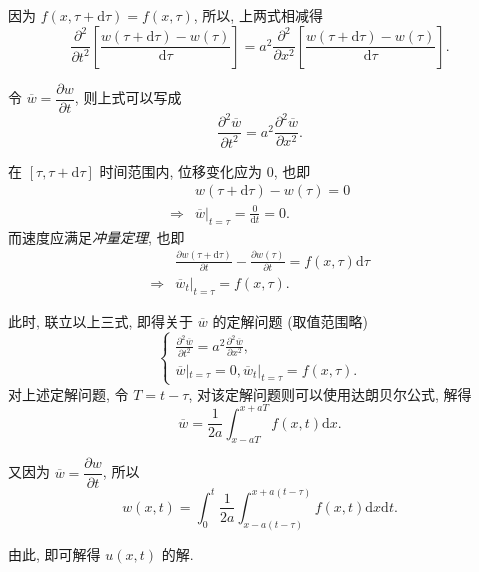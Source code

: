 因为 $f(x,\tau+\mathrm{d}\tau)=f(x,\tau)$, 所以, 上两式相减得
\begin{equation}
    \frac{\partial^2}{\partial t^2}\left[\frac{w(\tau+\mathrm{d}\tau)-w(\tau)}{\mathrm{d}\tau}\right]=a^2\frac{\partial^2}{\partial x^2}\left[\frac{w(\tau+\mathrm{d}\tau)-w(\tau)}{\mathrm{d}\tau}\right].
\end{equation}

令 $\overline{w}=\dfrac{\partial w}{\partial t}$, 则上式可以写成
\begin{equation}
    \frac{\partial^2\overline{w}}{\partial t^2}=a^2\frac{\partial^2\overline{w}}{\partial x^2}.
\end{equation}

在 $[\tau,\tau+\mathrm{d}\tau]$ 时间范围内, 位移变化应为 0, 也即
\begin{equation}
    \begin{aligned}
                    & w(\tau+\mathrm{d}\tau)-w(\tau)=0                \\
        \Rightarrow & \overline{w}|_{t=\tau}=\frac{0}{\mathrm{d}t}=0.
    \end{aligned}
\end{equation}
而速度应满足\textit{冲量定理}, 也即
\begin{equation}
    \begin{aligned}
                    & \frac{\partial w(\tau+\mathrm{d}\tau)}{\partial t}-\frac{\partial w(\tau)}{\partial t}=f(x,\tau)\mathrm{d}\tau \\
        \Rightarrow & \overline{w}_{t}|_{t=\tau}=f(x,\tau).
    \end{aligned}
\end{equation}

此时, 联立以上三式, 即得关于 $\overline{w}$ 的定解问题 (取值范围略)
\begin{equation}
    \begin{cases}
        \frac{\partial^2\overline{w}}{\partial t^2}=a^2\frac{\partial^2\overline{w}}{\partial x^2}, \\
        \overline{w}|_{t=\tau}=0,\overline{w}_{t}|_{t=\tau}=f(x,\tau).
    \end{cases}
\end{equation}
对上述定解问题, 令 $T=t-\tau$, 对该定解问题则可以使用达朗贝尔公式, 解得
\begin{equation}
    \overline{w}=\frac{1}{2a}\int_{x-aT}^{x+aT}f(x,t)\mathrm{d}x.
\end{equation}

又因为 $\overline{w}=\dfrac{\partial w}{\partial t}$, 所以
\begin{equation}
    w(x,t)=\int_{0}^{t}\frac{1}{2a}\int_{x-a(t-\tau)}^{x+a(t-\tau)}f(x,t)\mathrm{d}x\mathrm{d}t.
\end{equation}

由此, 即可解得 $u(x,t)$ 的解.
